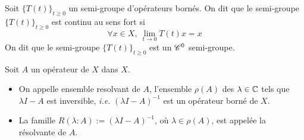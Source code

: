 \begin{frame}
    \begin{definition}
        Soit $\big\{T(t)\big\}_{t \geq 0}$ un semi-groupe d'opérateurs bornés. On dit que le semi-groupe $\big\{T(t)\big\}_{t \geq 0}$ est \textcolor{astral}{continu au sens fort} si 
        \begin{equation*}
            \forall x \in X, \ \lim_{t \to 0} T(t)x=x
        \end{equation*}
        On dit que le semi-groupe $\big\{T(t)\big\}_{t \geq 0}$ est un \textcolor{astral}{$\mathscr{C}^0$ semi-groupe}.
    \end{definition}
    \pause
    \begin{definition}
        Soit $A$ un opérateur de $X$ dans $X$. 
        \begin{itemize}
            \item On appelle \textcolor{astral}{ensemble resolvant de $A$}, l'ensemble $\rho(A)$ des $\lambda \in \mathbb{C}$ tels que $\lambda I-A$ est inversible, \textit{i.e.} $(\lambda I-A)^{-1}$ est un opérateur borné de $X$.
            \item La famille $R(\lambda : A):=(\lambda I-A)^{-1}$, où $\lambda \in \rho(A)$, est appelée la \textcolor{astral}{résolvante de $A$}.
        \end{itemize}
    \end{definition}
\end{frame}

